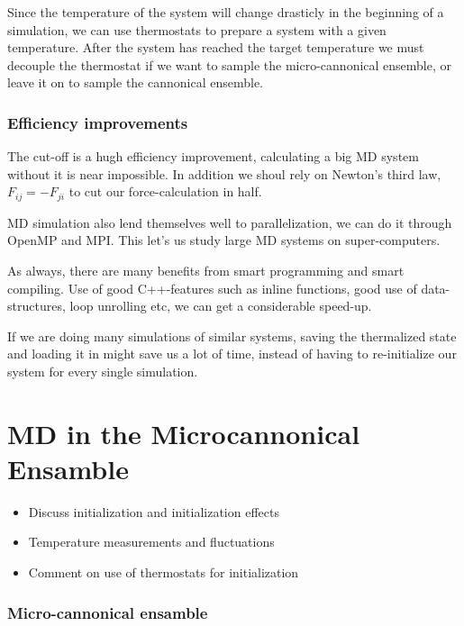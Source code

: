 \documentclass[a4paper, 11pt, notitlepage, english]{article}
\begin{document}
Since the temperature of the system will change drasticly in the beginning of a simulation, we can use thermostats to prepare a system with a given temperature. After the system has reached the target temperature we must decouple the thermostat if we want to sample the micro-cannonical ensemble, or leave it on to sample the cannonical ensemble.

\subsubsection*{Efficiency improvements}

The cut-off is a hugh efficiency improvement, calculating a big MD system without it is near impossible. In addition we shoul rely on Newton's third law, $F_{ij} = -F_{ji}$ to cut our force-calculation in half. 

MD simulation also lend themselves well to parallelization, we can do it through OpenMP and MPI. This let's us study large MD systems on super-computers.

As always, there are many benefits from smart programming and smart compiling. Use of good C++-features such as inline functions, good use of data-structures, loop unrolling etc, we can get a considerable speed-up.

If we are doing many simulations of similar systems, saving the thermalized state and loading it in might save us a lot of time, instead of having to re-initialize our system for every single simulation.

\clearpage


\section{MD in the Microcannonical Ensamble}
\begin{itemize}
	\item Discuss initialization and initialization effects
	\item Temperature measurements and fluctuations
	\item Comment on use of thermostats for initialization
\end{itemize}

\subsubsection*{Micro-cannonical ensamble}
\end{document}
